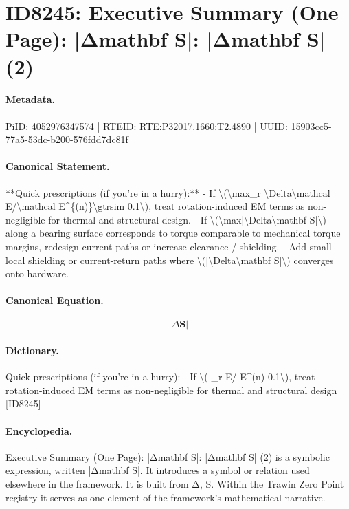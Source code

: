 \section*{ID8245: Executive Summary (One Page): |Δmathbf S|: |Δmathbf S| (2)}
\paragraph{Metadata.}
PiID: 4052976347574 | RTEID: RTE:P32017.1660:T2.4890 | UUID: 15903cc5-77a5-53dc-b200-576fdd7dc81f

\paragraph{Canonical Statement.}
**Quick prescriptions (if you’re in a hurry):** - If \textbackslash{}(\textbackslash{}max\_r \textbackslash{}Delta\textbackslash{}mathcal E/\textbackslash{}mathcal E\textasciicircum{}\{(n)\}\textbackslash{}gtrsim 0.1\textbackslash{}), treat rotation-induced EM terms as non-negligible for thermal and structural design. - If \textbackslash{}(\textbackslash{}max|\textbackslash{}Delta\textbackslash{}mathbf S|\textbackslash{}) along a bearing surface corresponds to torque comparable to mechanical torque margins, redesign current paths or increase clearance / shielding. - Add small local shielding or current-return paths where \textbackslash{}(|\textbackslash{}Delta\textbackslash{}mathbf S|\textbackslash{}) converges onto hardware.

\paragraph{Canonical Equation.}
\[
|\Delta\mathbf S|
\]

\paragraph{Dictionary.}
Quick prescriptions (if you’re in a hurry): - If \textbackslash{}( \_r E/ E\textasciicircum{}(n) 0.1\textbackslash{}), treat rotation-induced EM terms as non-negligible for thermal and structural design [ID8245]

\paragraph{Encyclopedia.}
Executive Summary (One Page): |Δmathbf S|: |Δmathbf S| (2) is a symbolic expression, written |Δmathbf S|. It introduces a symbol or relation used elsewhere in the framework. It is built from Δ, S. Within the Trawin Zero Point registry it serves as one element of the framework's mathematical narrative.
